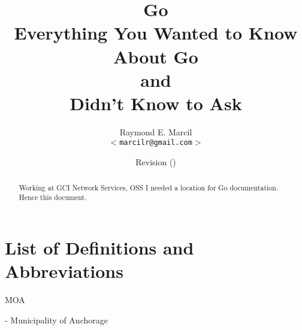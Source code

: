\documentclass[12pt,letterpaper,dvips]{article}
\title{Go\\
  \normalsize{Everything You Wanted to Know About Go\\
  and\\
  Didn't Know to Ask}}
\author{Raymond E. Marcil\\
        \texttt{$<$marcilr@gmail.com$>$}
}
\date{Revision \svnInfoRevision
      \hspace{2pt}
      (\svnInfoLongDate)}
\newenvironment{itemize*}%
  {\begin{itemize}%
    \setlength{\itemsep}{0pt}%
    \setlength{\parsep}{0pt}}%
  {\end{itemize}}
\begin{document}
\maketitle

\begin{abstract}
  Working at GCI Network Services, OSS I needed a location for Go
  documentation. Hence this document.

\end{abstract}

\vspace{2.0in}


\newpage
\tableofcontents

\newpage
\listoffigures
\listoftables


\newpage
\setcounter{secnumdepth}{0}
\section{List of Definitions and Abbreviations}
\begin{itemize*}
  \item{\begin{bf}MOA\end{bf}} - Municipality of Anchorage

\end{itemize*}
\end{document}
